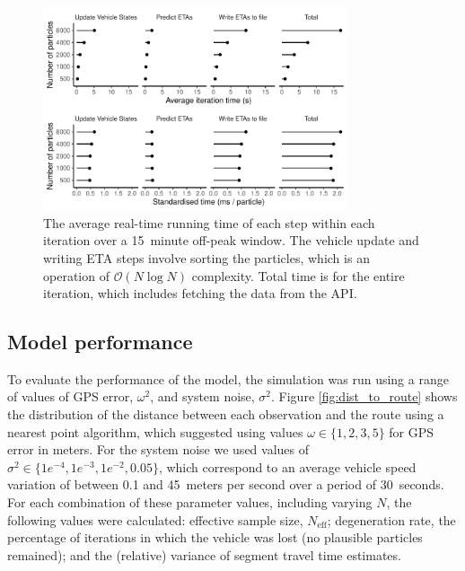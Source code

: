 \begin{figure}[tb]
    \centering
    \includegraphics[width=0.8\textwidth]{figures/04_model_results_timing.pdf}
    \caption{
        The average real-time running time of each step within each iteration
        over a 15~minute off-peak window.
        The vehicle update and writing ETA steps involve sorting the particles,
        which is an operation of $\mathcal{O}(N\log N)$ complexity.
        Total time is for the entire iteration, which includes fetching the data from the API.
    }
    \label{fig:timings}
\end{figure}




\subsection{Model performance}
\label{sec:model_perf}


To evaluate the performance of the model,
the simulation was run using a range of values of GPS error, $\omega^2$,
and system noise, $\sigma^2$.
Figure \ref{fig:dist_to_route} shows the distribution of the distance
between each observation and the route using a nearest point algorithm,
which suggested using values $\omega \in \{1,2,3,5\}$ for GPS error in meters.
For the system noise we used values of $\sigma^2\in \{1e^{-4},1e^{-3},1e^{-2},0.05\}$,
which correspond to an average vehicle speed variation of between 0.1 and 45~meters per second
over a period of 30~seconds.
For each combination of these parameter values, including varying $N$,
the following values were calculated:
effective sample size, $N_\text{eff}$;
degeneration rate, the percentage of iterations in which the vehicle was lost
(no plausible particles remained);
and the (relative) variance of segment travel time estimates.


